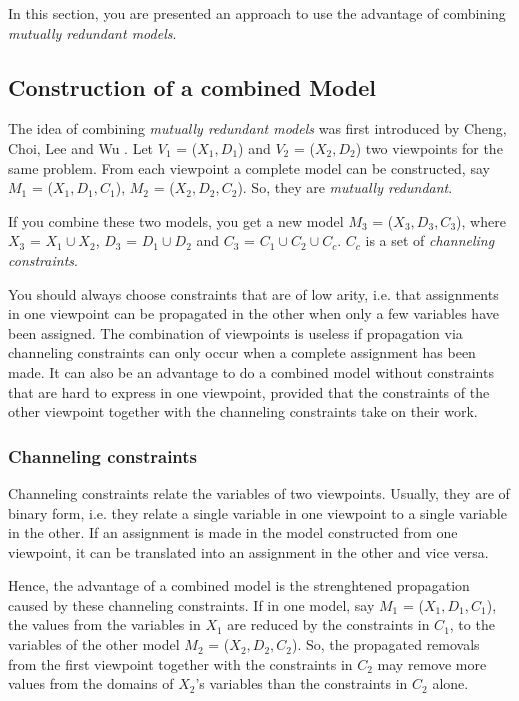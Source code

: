 \documentclass[a4paper,halfparskip]{scrartcl}
\begin{document}
In this section, you are presented an approach to use the
advantage of combining \emph{mutually redundant models}.


\subsection{Construction of a combined Model}
The idea of combining \emph{mutually redundant models} was
first introduced by  Cheng, Choi, Lee and Wu \cite{9}.
Let $V_1$ = ($X_1, D_1$) and $V_2$ = ($X_2, D_2$) two viewpoints
for the same problem. From each viewpoint a complete
model can be constructed, say $M_1$ = ($X_1, D_1, C_1$), 
$M_2$ = ($X_2, D_2, C_2$). So, they are \emph{mutually redundant}.

If you combine these two models, you get a new model 
$M_3$ = ($X_3, D_3, C_3$), where $X_3$ = $X_1 \cup X_2$, 
$D_3$ = $D_1 \cup D_2$
and $C_3$ =  $C_1 \cup C_2 \cup C_c$. $C_c$ is a set of
\emph{channeling constraints}.

You should always choose constraints that are of low arity, i.e.
that assignments in one viewpoint can be propagated in the other when
only a few variables have been assigned. 
The combination of viewpoints is useless if propagation
via channeling constraints can only occur when a complete assignment
has been made. It can also be an advantage to do a combined model
without constraints that are hard to express in one viewpoint,
provided that the constraints of the other viewpoint together
with the channeling constraints take on their work.


\subsubsection{Channeling constraints}
Channeling constraints relate the variables of two
viewpoints. Usually, they are of binary form, i.e.
they relate a single variable in one viewpoint to
a single variable in the other. If an assignment 
is made in the model constructed
from one viewpoint, it can be translated into an 
assignment in the other and vice versa.

Hence, the advantage of a combined model is the strenghtened
propagation caused by these channeling constraints. If in one
model, say $M_1$ = ($X_1, D_1, C_1$), the values from the variables
in $X_1$ are reduced by the constraints in $C_1$,  to the variables of the
other model $M_2$ = ($X_2, D_2, C_2$). So, the propagated removals
from the first viewpoint together with the constraints in $C_2$ may
remove more values from the domains of $X_2$'s variables than the
constraints in $C_2$ alone.
\end{document}
